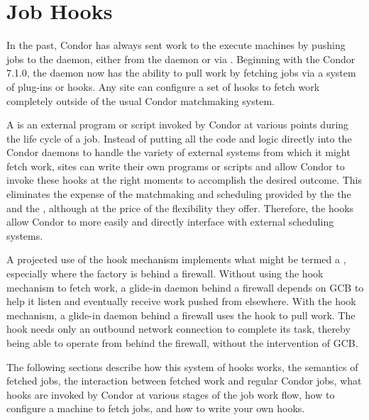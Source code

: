 \section{\label{sec:job-hooks}Job Hooks}

In the past, Condor has always sent work to the execute machines by
pushing jobs to the  daemon, either from the 
daemon or via .
Beginning with the Condor 7.1.0, the  daemon now has the
ability to pull work by fetching jobs via a system of plug-ins or
hooks.
Any site can configure a set of hooks to fetch work completely
outside of the usual Condor matchmaking system.

A  is an external program or script invoked by Condor at various
points during the life cycle of a job.
Instead of putting all the code and logic directly into the Condor
daemons to handle the variety of external systems from which it
might fetch work,
sites can write their own programs or scripts and allow
Condor to invoke these hooks at the right moments to accomplish the
desired outcome.
This eliminates the expense of the matchmaking and 
scheduling provided by the the  and
the , although at the price of the flexibility
they offer.
Therefore, the hooks allow Condor to more easily and directly interface with
external scheduling systems.

A projected use of the hook mechanism implements what might
be termed a , especially where the
factory is behind a firewall.
Without using the hook mechanism to fetch work,
a glide-in  daemon behind a firewall
depends on GCB to help it listen and eventually receive
work pushed from elsewhere.
With the hook mechanism, a glide-in  daemon
behind a firewall uses the hook to pull work.
The hook needs only an outbound network connection to complete
its task,
thereby being able to operate from behind the firewall,
without the intervention of GCB.

The following sections describe how this system of hooks works,
the semantics of fetched jobs, the interaction between fetched work
and regular Condor jobs, what hooks are invoked by Condor at various
stages of the job work flow, how to configure a machine to fetch jobs,
and how to write your own hooks.



